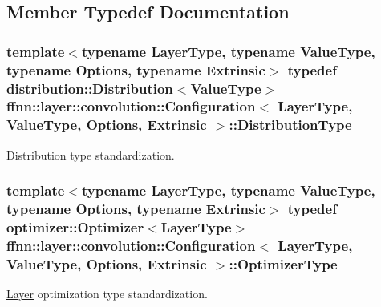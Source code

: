 \subsection{Member Typedef Documentation}
\hypertarget{classffnn_1_1layer_1_1convolution_1_1_configuration_ac34e983386fa6c4af4311cf95371444b}{
\subsubsection[{Distribution\-Type}]{\setlength{\rightskip}{0pt plus 5cm}template$<$typename Layer\-Type, typename Value\-Type, typename Options, typename Extrinsic$>$ typedef {\bf distribution\-::\-Distribution}$<$Value\-Type$>$ {\bf ffnn\-::layer\-::convolution\-::\-Configuration}$<$ {\bf Layer\-Type}, Value\-Type, Options, Extrinsic $>$\-::{\bf Distribution\-Type}}}\label{classffnn_1_1layer_1_1convolution_1_1_configuration_ac34e983386fa6c4af4311cf95371444b}


Distribution type standardization. 

\hypertarget{classffnn_1_1layer_1_1convolution_1_1_configuration_af8f1c1e1c842a15756475259dcdd6bd4}{
\subsubsection[{Optimizer\-Type}]{\setlength{\rightskip}{0pt plus 5cm}template$<$typename Layer\-Type, typename Value\-Type, typename Options, typename Extrinsic$>$ typedef {\bf optimizer\-::\-Optimizer}$<${\bf Layer\-Type}$>$ {\bf ffnn\-::layer\-::convolution\-::\-Configuration}$<$ {\bf Layer\-Type}, Value\-Type, Options, Extrinsic $>$\-::{\bf Optimizer\-Type}}}\label{classffnn_1_1layer_1_1convolution_1_1_configuration_af8f1c1e1c842a15756475259dcdd6bd4}


\hyperlink{classffnn_1_1layer_1_1_layer}{Layer} optimization type standardization. 

